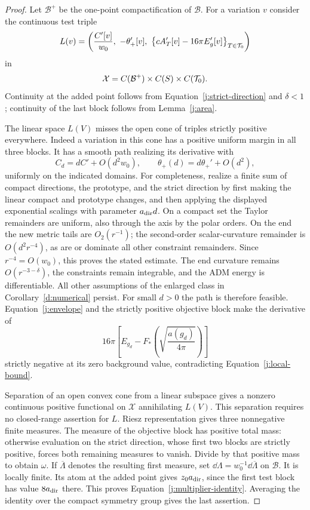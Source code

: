\begin{proof}
Let \(\mathcal B^+\) be the one-point compactification of \(\mathcal B\).
For a variation \(v\) consider the continuous test triple
\[
 L(v)=\left(
 \frac{C'[v]}{w_0},\ -\theta_+'[v],\
 \left\{cA'_T[v]-16\pi E'_g[v]\right\}_{T\in\mathcal T_0}
 \right)
\]
in
\[
 \mathcal X=C(\mathcal B^+)\times C(S)\times C(\mathcal T_0).
\]
Continuity at the added point follows from
Equation~\eqref{j:strict-direction} and \(\delta<1\); continuity of the
last block follows from Lemma~\ref{j:area}.

The linear space \(L(V)\) misses the open cone of triples strictly
positive everywhere. Indeed a variation in this cone has a positive
uniform margin in all three blocks. It has a smooth path realizing
its derivative with
\[
 C_d=dC'+O(d^2w_0),\qquad
 \theta_+(d)=d\theta_+'+O(d^2),
\]
uniformly on the indicated domains. For completeness, realize a finite
sum of compact directions, the prototype, and the strict direction by
first making the linear compact and prototype changes, and then applying
the displayed exponential scalings with parameter \(a_{\rm dir}d\).
On a compact set the Taylor remainders are uniform, also through the
axis by the polar orders. On the end the new metric tails are
\(O_2(r^{-1})\); the second-order scalar-curvature remainder is
\(O(d^2r^{-4})\), as are or dominate all other constraint remainders.
Since \(r^{-4}=O(w_0)\), this proves the stated estimate.
The end curvature remains \(O(r^{-3-\delta})\), the constraints remain
integrable, and the ADM energy is differentiable. All other assumptions
of the enlarged class in Corollary~\ref{d:numerical} persist.
For small \(d>0\) the path is therefore feasible. Equation~\eqref{j:envelope}
and the strictly positive objective block make the derivative of
\[
 16\pi\left[
 E_{g_d}-F_*\left(\sqrt{\frac{a(g_d)}{4\pi}}\right)\right]
\]
strictly negative at its zero background value, contradicting
Equation~\eqref{j:local-bound}.

Separation of an open convex cone from a linear subspace gives a
nonzero continuous positive functional on \(\mathcal X\) annihilating
\(L(V)\). This separation requires no closed-range assertion for \(L\).
Riesz representation gives three nonnegative finite measures.
The measure of the objective block has positive total mass: otherwise
evaluation on the strict direction, whose first two blocks are strictly
positive, forces both remaining measures to vanish. Divide by that
positive mass to obtain \(\omega\). If \(\overline\Lambda\) denotes the
resulting first measure, set
\(\dd\Lambda=w_0^{-1}\dd\overline\Lambda\) on \(\mathcal B\).
It is locally finite. Its atom at the added point gives
\(z_0a_{\rm dir}\), since the first test block has value
\(8a_{\rm dir}\) there. This proves
Equation~\eqref{j:multiplier-identity}. Averaging the identity over the
compact symmetry group gives the last assertion.
\end{proof}

